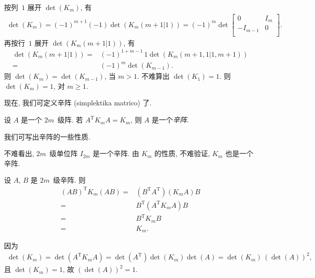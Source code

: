 按列~\(1\) 展开 \(\det {(K_m)}\), 有
\begin{align*}
    \det {(K_m)}
    = (-1)^{m+1} (-1) \det {(K_m ({m+1}|1))}
    = (-1)^m \det {
        \begin{bmatrix}
            0        & I_m \\
            -I_{m-1} & 0   \\
        \end{bmatrix}
    }.
\end{align*}
再按行~\(1\) 展开 \(\det {(K_m ({m+1}|1))}\), 有
\begin{align*}
    \det {(K_m ({m+1}|1))}
    = {} &
    (-1)^{1+m-1}\, 1 \det {(K_m ({m+1,1}|{1,m+1}))}
    \\
    = {} &
    (-1)^m \det {(K_{m-1})}.
\end{align*}
则 \(\det {(K_m)} = \det {(K_{m-1})}\),
当 \(m > 1\).
不难算出 \(\det {(K_1)} = 1\).
则 \(\det {(K_m)} = 1\), 对 \(m \geq 1\).

现在, 我们可定义辛阵 (simplektika matrico) 了.

\begin{definition}
    设 \(A\) 是一个 \(2m\)~级阵.
    若 \(A^{\mathrm{T}} K_m A = K_m\),
    则 \(A\) 是一个\emph{辛阵}.
\end{definition}

我们可写出辛阵的一些性质.

不难看出, \(2m\)~级单位阵 \(I_{2m}\) 是一个辛阵.
由 \(K_m\) 的性质, 不难验证,
\(K_m\) 也是一个辛阵.

设 \(A\), \(B\) 是 \(2m\)~级辛阵.
则
\begin{align*}
    (AB)^{\mathrm{T}} K_m (AB)
    = {} &
    (B^{\mathrm{T}} A^{\mathrm{T}})
    (K_m A) B
    \\
    = {} &
    B^{\mathrm{T}}
    (A^{\mathrm{T}} K_m A)
    B
    \\
    = {} &
    B^{\mathrm{T}} K_m B
    \\
    = {} &
    K_m.
\end{align*}

因为
\begin{align*}
    \det {(K_m)}
    = \det {(A^{\mathrm{T}} K_m A)}
    = \det {(A^{\mathrm{T}})} \det {(K_m)} \det {(A)}
    = \det {(K_m)}\, (\det {(A)})^2,
\end{align*}
且 \(\det {(K_m)} = 1\),
故 \((\det {(A)})^2 = 1\).

